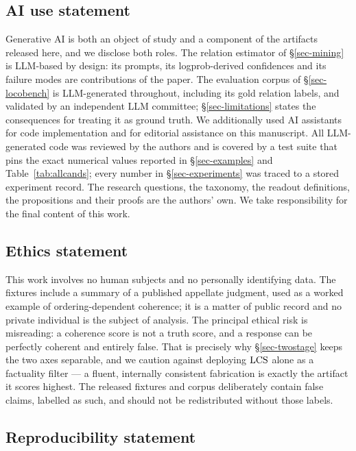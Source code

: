\subsection*{AI use statement}

Generative AI is both an object of study and a component of the artifacts released here, and we
disclose both roles. The relation estimator of \S\ref{sec-mining} is LLM-based by design: its prompts,
its logprob-derived confidences and its failure modes are contributions of the paper. The evaluation
corpus of \S\ref{sec-locobench} is LLM-generated throughout, including its gold relation labels, and
validated by an independent LLM committee; \S\ref{sec-limitations} states the consequences for treating
it as ground truth. We additionally used AI assistants for code implementation and for editorial
assistance on this manuscript. All LLM-generated code was reviewed by the authors and is covered by a
test suite that pins the exact numerical values reported in \S\ref{sec-examples} and
Table~\ref{tab:allcands}; every number in \S\ref{sec-experiments} was traced to a stored experiment
record. The research questions, the taxonomy, the readout definitions, the propositions and their
proofs are the authors' own. We take responsibility for the final content of this work.

\subsection*{Ethics statement}

This work involves no human subjects and no personally identifying data. The fixtures include a summary
of a published appellate judgment, used as a worked example of ordering-dependent coherence; it is a
matter of public record and no private individual is the subject of analysis. The principal ethical risk
is misreading: a coherence score is not a truth score, and a response can be perfectly coherent and
entirely false. That is precisely why \S\ref{sec-twostage} keeps the two axes separable, and we caution
against deploying $\mathrm{LCS}$ alone as a factuality filter --- a fluent, internally consistent fabrication is
exactly the artifact it scores highest. The released fixtures and corpus deliberately contain false
claims, labelled as such, and should not be redistributed without those labels.

\subsection*{Reproducibility statement}


